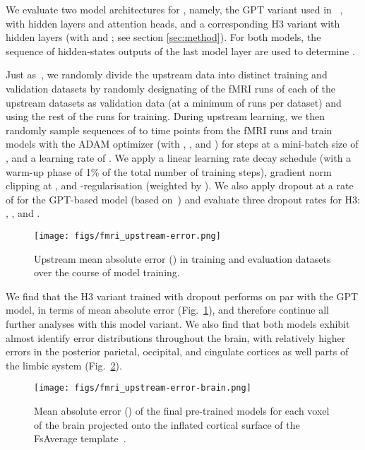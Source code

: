 \documentclass{article}
\begin{document}
We evaluate two model architectures for , namely, the GPT variant used in ~\citep{thomas_fmri_2022}, with  hidden layers and  attention heads, and a corresponding H3 variant with  hidden layers (with  and ; see section \ref{sec:method}). For both models, the sequence of hidden-states outputs of the last model layer are used to determine .

Just as~\citep{thomas_fmri_2022}, we randomly divide the upstream data into distinct training and validation datasets by randomly designating  of the fMRI runs of each of the  upstream datasets as validation data (at a minimum of  runs per dataset) and using the rest of the runs for training. During upstream learning, we then randomly sample sequences of  to  time points from the fMRI runs and train models with the ADAM optimizer (with , , and  ) for  steps at a mini-batch size of , and a learning rate of . We apply a linear learning rate decay schedule (with a warm-up phase of 1\% of the total number of training steps), gradient norm clipping at , and -regularisation (weighted by ). We also apply dropout at a rate of  for the GPT-based model (based on~\citep{thomas_fmri_2022}) and evaluate three dropout rates for H3: , , and . 

\begin{figure}[h]
    \centering
    \texttt{[image: figs/fmri\_upstream-error.png]}
    \caption{\label{fig:fmri-upstream} Upstream mean absolute error () in training and evaluation datasets over the course of model training.}
\end{figure}

We find that the H3 variant trained with  dropout performs on par with the GPT model, in terms of mean absolute error (Fig.\ \ref{fig:fmri-upstream}), and therefore continue all further analyses with this model variant. We also find that both models exhibit almost identify  error distributions throughout the brain, with relatively higher errors in the posterior parietal, occipital, and cingulate cortices as well parts of the limbic system (Fig.\ \ref{fig:fmri-upstream-brain}).

\begin{figure}[h]
    \centering
    \texttt{[image: figs/fmri\_upstream-error-brain.png]}
    \caption{\label{fig:fmri-upstream-brain} Mean absolute error () of the final pre-trained models for each voxel of the brain projected onto the inflated cortical surface of the FsAverage template~\citep{fischl_2012_freesurfer}.}
\end{figure}
\end{document}
